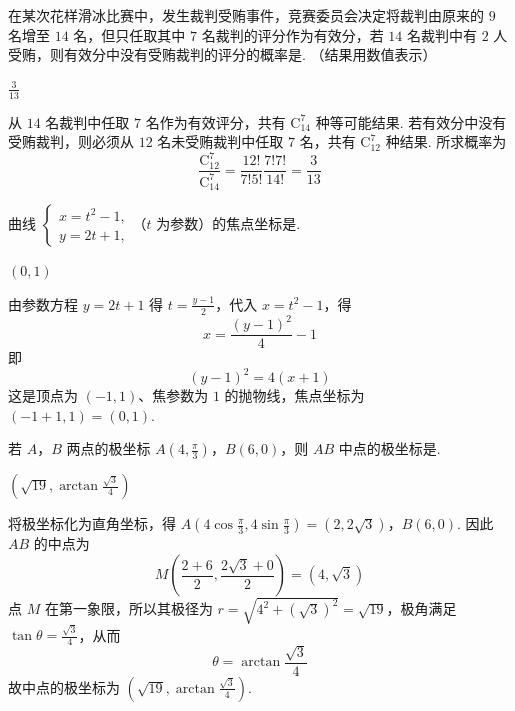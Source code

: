 \begin{problem}
在某次花样滑冰比赛中，发生裁判受贿事件，竞赛委员会决定将裁判由原来的 \(9\) 名增至 \(14\) 名，但只任取其中 \(7\) 名裁判的评分作为有效分，若 \(14\) 名裁判中有 \(2\) 人受贿，则有效分中没有受贿裁判的评分的概率是\fillinblank{}. （结果用数值表示）

\begin{answer}
\(\frac{3}{13}\)
\end{answer}

\begin{solution}
从 \(14\) 名裁判中任取 \(7\) 名作为有效评分，共有 \(\mathrm C_{14}^{7}\) 种等可能结果. 若有效分中没有受贿裁判，则必须从 \(12\) 名未受贿裁判中任取 \(7\) 名，共有 \(\mathrm C_{12}^{7}\) 种结果. 所求概率为
\[
\frac{\mathrm C_{12}^{7}}{\mathrm C_{14}^{7}}=\frac{12!}{7!5!}\frac{7!7!}{14!}=\frac{3}{13}
\]
\end{solution}
\end{problem}

\begin{problem}
曲线 \(\begin{cases}
x = t^2 - 1,\\
y = 2t + 1,
\end{cases}\)（\(t\) 为参数）的焦点坐标是\fillinblank{}.

\begin{answer}
\((0,1)\)
\end{answer}

\begin{solution}
由参数方程 \(y=2t+1\) 得 \(t=\frac{y-1}{2}\)，代入 \(x=t^2-1\)，得
\[
x=\frac{(y-1)^2}{4}-1
\]
即
\[
(y-1)^2=4(x+1)
\]
这是顶点为 \((-1,1)\)、焦参数为 \(1\) 的抛物线，焦点坐标为
\((-1+1,1)=(0,1)\).
\end{solution}
\end{problem}

\begin{problem}
若 \(A\)，\(B\) 两点的极坐标 \(A\left(4, \frac{\pi}{3}\right)\)，\(B(6,0)\)，则 \(AB\) 中点的极坐标是\fillinblank{}.

\begin{answer}
\(\left(\sqrt{19},\arctan\frac{\sqrt{3}}{4}\right)\)
\end{answer}

\begin{solution}
将极坐标化为直角坐标，得
\(A\left(4\cos\frac{\pi}{3},4\sin\frac{\pi}{3}\right)=(2,2\sqrt{3})\)，\(B(6,0)\).
因此 \(AB\) 的中点为
\[
M\left(\frac{2+6}{2},\frac{2\sqrt{3}+0}{2}\right)=(4,\sqrt{3})
\]
点 \(M\) 在第一象限，所以其极径为 \(r=\sqrt{4^2+(\sqrt{3})^2}=\sqrt{19}\)，极角满足 \(\tan\theta=\frac{\sqrt{3}}4\)，从而
\[
\theta=\arctan\frac{\sqrt{3}}4
\]
故中点的极坐标为 \(\left(\sqrt{19},\arctan\frac{\sqrt{3}}4\right)\).
\end{solution}
\end{problem}

